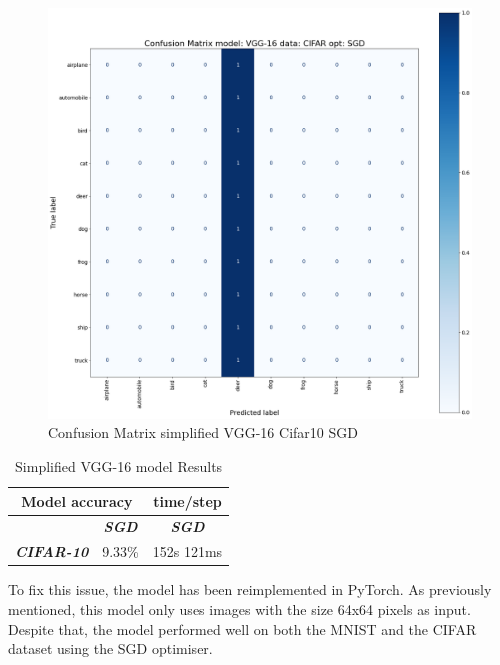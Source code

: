 \documentclass[conference]{IEEEtran}
\begin{document}
\begin{figure}[!htbp]
    \centering
    \includegraphics[scale=0.05]{img/matrix_VGG_CIFAR_SGD.png}
    \caption{Confusion Matrix simplified VGG-16 Cifar10 SGD}
    \label{fig:x matrix_VGG_CIFAR_SGD}
\end{figure}

\begin{table}[!htbp]
    \caption{Simplified VGG-16 model Results}
    \begin{center}
    \begin{tabular}{|c|c|c|}
    \cline{1-3} 
    \multicolumn{2}{|c|}{\textbf{Model accuracy}} & \multicolumn{1}{|c|}{\textbf{time/step}} \\
    \hline 
    \textit{}  & \textbf{\textit{SGD}}  & \textbf{\textit{SGD}} \\
    \hline
    \textbf{\textit{CIFAR-10}} & 9.33\% & 152s 121ms \\
    \cline{1-3} 
    \end{tabular}
    \label{tab: VGG model accuracy}
    \end{center}
\end{table}

To fix this issue, the model has been reimplemented in PyTorch.
As previously mentioned, this model only uses images with the size 64x64 pixels as input.
Despite that, the model performed well on both the MNIST and the CIFAR dataset using the SGD optimiser. 
\end{document}
